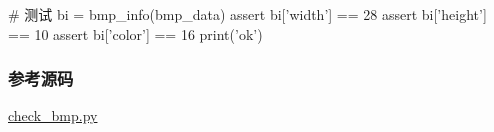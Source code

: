 \begin{pythoncode}
# 测试
bi = bmp_info(bmp_data)
assert bi['width'] == 28
assert bi['height'] == 10
assert bi['color'] == 16
print('ok')
\end{pythoncode}

\hypertarget{ux53c2ux8003ux6e90ux7801}{%
\subsubsection{参考源码}\label{ux53c2ux8003ux6e90ux7801}}

\href{https://github.com/michaelliao/learn-python3/blob/master/samples/commonlib/check_bmp.py}{check\_bmp.py}

